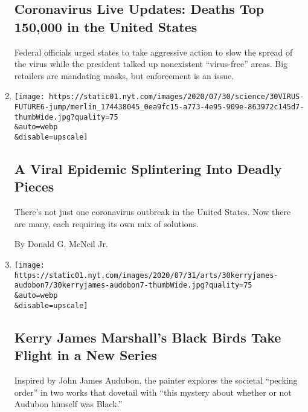 \begin{enumerate}
  \hypertarget{coronavirus-live-updates-deaths-top-150000-in-the-united-states}{%
  \subsection{Coronavirus Live Updates: Deaths Top 150,000 in the United
  States}\label{coronavirus-live-updates-deaths-top-150000-in-the-united-states}}

  Federal officials urged states to take aggressive action to slow the
  spread of the virus while the president talked up nonexistent
  ``virus-free'' areas. Big retailers are mandating masks, but
  enforcement is an issue.
\item
  \href{/2020/07/29/health/coronavirus-future-america.html}{}

  \texttt{[image: https://static01.nyt.com/images/2020/07/30/science/30VIRUS-FUTURE6-jump/merlin\_174438045\_0ea9fc15-a773-4e95-909e-863972c145d7-thumbWide.jpg?quality=75\\\&auto=webp\\\&disable=upscale]}

  \hypertarget{a-viral-epidemic-splintering-into-deadly-pieces}{%
  \subsection{A Viral Epidemic Splintering Into Deadly
  Pieces}\label{a-viral-epidemic-splintering-into-deadly-pieces}}

  There's not just one coronavirus outbreak in the United States. Now
  there are many, each requiring its own mix of solutions.

  By Donald G. McNeil Jr.
\item
  \href{/2020/07/29/arts/design/kerry-james-marshall-audubon.html}{}

  \texttt{[image: https://static01.nyt.com/images/2020/07/31/arts/30kerryjames-audobon7/30kerryjames-audobon7-thumbWide.jpg?quality=75\\\&auto=webp\\\&disable=upscale]}

  \hypertarget{kerry-james-marshalls-black-birds-take-flight-in-a-new-series}{%
  \subsection{Kerry James Marshall's Black Birds Take Flight in a New
  Series}\label{kerry-james-marshalls-black-birds-take-flight-in-a-new-series}}

  Inspired by John James Audubon, the painter explores the societal
  ``pecking order'' in two works that dovetail with ``this mystery about
  whether or not Audubon himself was Black.''


\end{enumerate}
